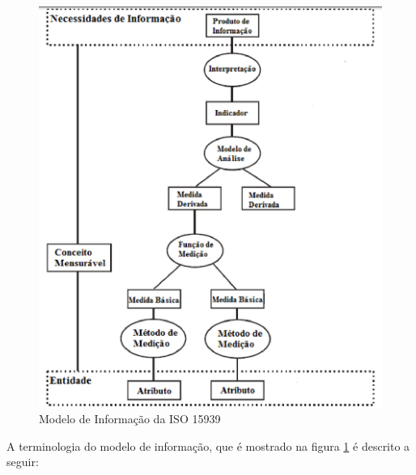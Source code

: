 \begin{figure}[h]
\centering
	\includegraphics[keepaspectratio=true,scale=0.55]{figuras/modelo15939.eps}
	\caption{Modelo de Informação da ISO 15939}
	\label{informação}
\end{figure}

A terminologia do modelo de informação, que é mostrado na figura 
\ref{informação} é descrito a seguir:

